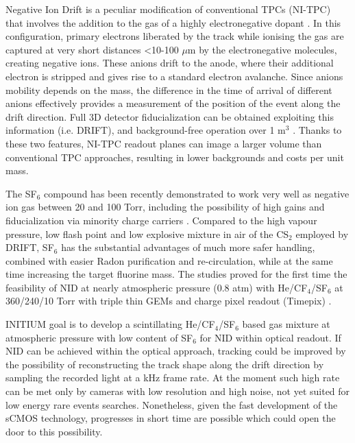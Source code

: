 \documentclass[physics,article,submit,moreauthors,pdftex]{Definitions/mdpi}
\begin{document}
Negative Ion Drift is a peculiar modification of conventional TPCs (NI-TPC) that involves the addition to the gas of a highly electronegative dopant \cite{Martoff:2000wi, Ohnuki:2000ex}. In this configuration, primary electrons liberated by the track while ionising the gas are captured at very short distances <10-100 $\mu$m by the electronegative molecules, creating negative ions. These anions drift to the anode, where their additional electron is stripped and gives rise to a standard electron avalanche. 
Since anions mobility depends on the mass, the difference in the time of arrival of different anions effectively provides a measurement of the position of the event along the drift direction. Full 3D detector fiducialization can be obtained exploiting this information (i.e. DRIFT), and background-free operation over 1 m$^3$ \cite{Battat:2016xxe}. Thanks to these two features, NI-TPC readout planes can image a larger volume than conventional TPC approaches, resulting in lower backgrounds and costs per unit mass.

The SF$_6$ compound has been recently demonstrated to work very well as negative ion gas between 20 and 100 Torr, including the possibility of high gains and fiducialization via minority charge carriers \cite{Phan:2016veo, Ikeda:2020pex, Lightfoot:2007zz}. Compared to the high vapour pressure, low flash point and low explosive mixture in air of the CS$_2$ employed by DRIFT, SF$_6$ has the substantial advantages of much more safer handling, combined with easier Radon purification and re-circulation, while at the same time increasing the target fluorine mass. The studies proved for the first time the feasibility of NID at nearly atmospheric pressure (0.8 atm) with He/CF$_4$/SF$_6$ at 360/240/10 Torr with triple thin GEMs and charge pixel readout (Timepix) \cite{Baracchini:2017ysg}.

INITIUM goal is to develop a scintillating He/CF$_4$/SF$_6$ based gas mixture at atmospheric pressure with low content of SF$_6$ for NID within optical readout. If NID can be achieved within the optical approach, tracking could be improved by the possibility of reconstructing the track shape along the drift direction by sampling the recorded light at a kHz frame rate. At the moment such high rate can be met only by cameras with low resolution and high noise, not yet suited for low energy rare events searches. Nonetheless, given the fast development of the sCMOS technology, progresses in short time are possible which could open the door to this possibility.
\end{document}
